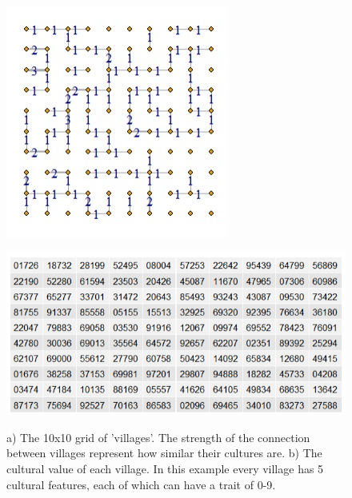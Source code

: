\begin{figure}[t]
    \centering
    \begin{minipage}{0.49\textwidth}
        \centering
        \includegraphics[width=\textwidth]{images/cultural_nodes1.jpg}
        \label{fig:sub1}
    \end{minipage}\hfill
    \begin{minipage}
{0.49\textwidth}
        \centering
        \includegraphics[width=\textwidth]{images/cultural_nodes2.jpg}
        \label{fig:sub2}
    \end{minipage}
    \caption{a) The 10x10 grid of 'villages'. The strength of the connection between villages represent how similar their cultures are. b) The cultural value of each village. In this example every village has 5 cultural features, each of which can have a trait of 0-9.}
    \label{fig:overall}
\end{figure}

